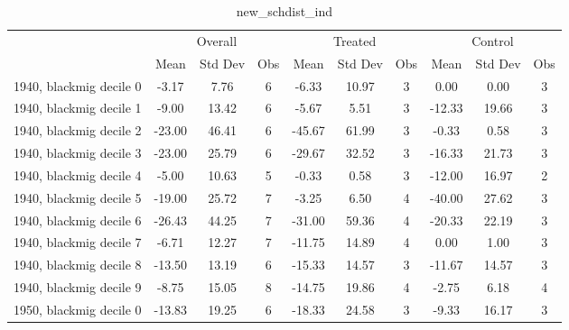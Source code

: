 \begin{table}[htbp]\centering
\def\sym#1{\ifmmode^{#1}\else\(^{#1}\)\fi}
\caption{new\_schdist\_ind \label{tab1}}
\begin{tabular}{l*{3}{ccc}}
\toprule
                    &\multicolumn{3}{c}{Overall}           &\multicolumn{3}{c}{Treated}           &\multicolumn{3}{c}{Control}           \\
                    &        Mean&     Std Dev&         Obs&        Mean&     Std Dev&         Obs&        Mean&     Std Dev&         Obs\\
\midrule
1940, blackmig decile 0&       -3.17&        7.76&           6&       -6.33&       10.97&           3&        0.00&        0.00&           3\\
1940, blackmig decile 1&       -9.00&       13.42&           6&       -5.67&        5.51&           3&      -12.33&       19.66&           3\\
1940, blackmig decile 2&      -23.00&       46.41&           6&      -45.67&       61.99&           3&       -0.33&        0.58&           3\\
1940, blackmig decile 3&      -23.00&       25.79&           6&      -29.67&       32.52&           3&      -16.33&       21.73&           3\\
1940, blackmig decile 4&       -5.00&       10.63&           5&       -0.33&        0.58&           3&      -12.00&       16.97&           2\\
1940, blackmig decile 5&      -19.00&       25.72&           7&       -3.25&        6.50&           4&      -40.00&       27.62&           3\\
1940, blackmig decile 6&      -26.43&       44.25&           7&      -31.00&       59.36&           4&      -20.33&       22.19&           3\\
1940, blackmig decile 7&       -6.71&       12.27&           7&      -11.75&       14.89&           4&        0.00&        1.00&           3\\
1940, blackmig decile 8&      -13.50&       13.19&           6&      -15.33&       14.57&           3&      -11.67&       14.57&           3\\
1940, blackmig decile 9&       -8.75&       15.05&           8&      -14.75&       19.86&           4&       -2.75&        6.18&           4\\
1950, blackmig decile 0&      -13.83&       19.25&           6&      -18.33&       24.58&           3&       -9.33&       16.17&           3\\

\end{tabular}
\end{table}

